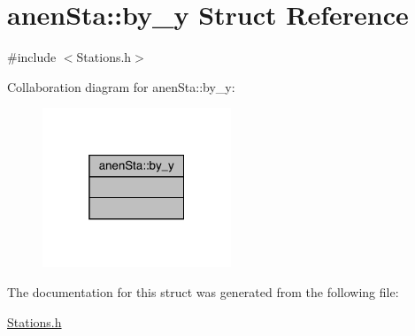 \hypertarget{structanen_sta_1_1by__y}{}\section{anen\+Sta\+:\+:by\+\_\+y Struct Reference}
\label{structanen_sta_1_1by__y}


{\ttfamily \#include $<$Stations.\+h$>$}



Collaboration diagram for anen\+Sta\+:\+:by\+\_\+y\+:
\nopagebreak
\begin{figure}[H]
\begin{center}
\leavevmode
\includegraphics[width=160pt]{structanen_sta_1_1by__y__coll__graph}
\end{center}
\end{figure}


The documentation for this struct was generated from the following file\+:\begin{DoxyCompactItemize}
\item 
\mbox{\hyperlink{_stations_8h}{Stations.\+h}}\end{DoxyCompactItemize}
